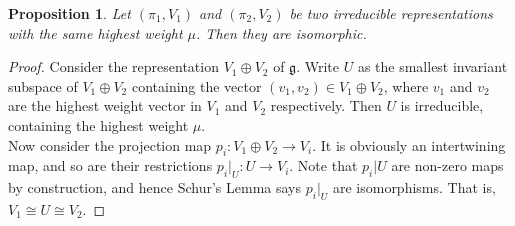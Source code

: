 \documentclass[11pt]{article}
\newtheorem{proposition}[theorem]{Proposition}
\newcommand{\mf}[1]{\mathfrak{#1}}
\begin{document}
\begin{proposition}
Let $(\pi_1,V_1)$ and $(\pi_2, V_2)$ be two irreducible representations with the same highest weight $\mu$. Then they are isomorphic.
\end{proposition}
\begin{proof}
Consider the representation $V_1 \oplus V_2$ of $\mf{g}$. Write $U$ as the smallest invariant subspace of $V_1 \oplus V_2$ containing the vector $(v_1,v_2) \in V_1 \oplus V_2$, where $v_1$ and $v_2$ are the highest weight vector in $V_1$ and $V_2$ respectively. Then $U$ is irreducible, containing the highest weight $\mu$.\\
Now consider the projection map $p_i: V_1 \oplus V_2 \to V_i$. It is obviously an intertwining map, and so are their restrictions $p_i|_U: U \to V_i$. Note that $p_i|U$ are non-zero maps by construction, and hence Schur's Lemma says $p_i|_U$ are isomorphisms. That is, $V_1 \cong U \cong V_2$.
\end{proof}
\end{document}
